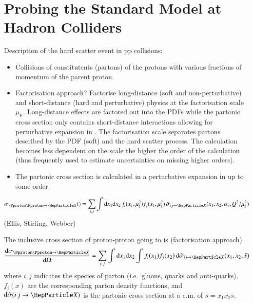 \section{Probing the Standard Model at Hadron Colliders}

Description of the hard scatter event in pp collisions:
\begin{itemize}
\item Collisions of constitutents (partons) of the protons with
  various fractions of momentum of the parent proton.

\item Factorisation approach? Factorise long-distance (soft and
  non-perturbative) and short-distance (hard and perturbative) physics
  at the factorisation scale $\mu_\text{F}$. Long-distance effects are
  factored out into the PDFs while the partonic cross section only
  contains short-distance interactions allowing for perturbative
  expansion in \alphas. The factorisation scale separates partons
  described by the PDF (soft) and the hard scatter process. The
  calculation becomes less dependent on the scale the higher the order
  of the calculation (thus frequently used to estimate uncertainties
  on missing higher orders).

\item The partonic cross section is calculated in a perturbative
  expansion in \alphas up to some order.
\end{itemize}

\begin{align*}
  \sigma_{\Pproton\Pproton \ra \PX}() = \sum_{i,j} \int \mathrm{d}x_1 \mathrm{d}x_2 \, f_i(x_1, \muF^2) f_j(x_1, \muF^2) \, \hat{\sigma}_{i j \ra \PX}(x_1, x_2, \alphas, Q^2 / \muF^2)
\end{align*}
(Ellis, Stirling, Webber)

The inclusive cross section of proton-proton going to \PX is (factorisation approach)
\begin{align*}
  \frac{\mathrm{d}\sigma_{\Pproton\Pproton \ra \PX}}{\mathrm{d}\Omega} = \sum_{i,j} \int \mathrm{d}x_1 \mathrm{d}x_2 \int f_i(x_1) f_j(x_2) \, \mathrm{d}\hat{\sigma}_{i j \ra \PX}(x_1, x_2, \hat{s})
\end{align*}
where $i, j$ indicates the species of parton (i.e.\ gluons, quarks and
anti-quarks), $f_i(x)$ are the corresponding parton density functions,
and $\mathrm{d}\hat{\sigma}(i\,j \ra \PX)$ is the partonic cross
section at a c.m. of $\hat{s} = x_1 x_2 s$.

